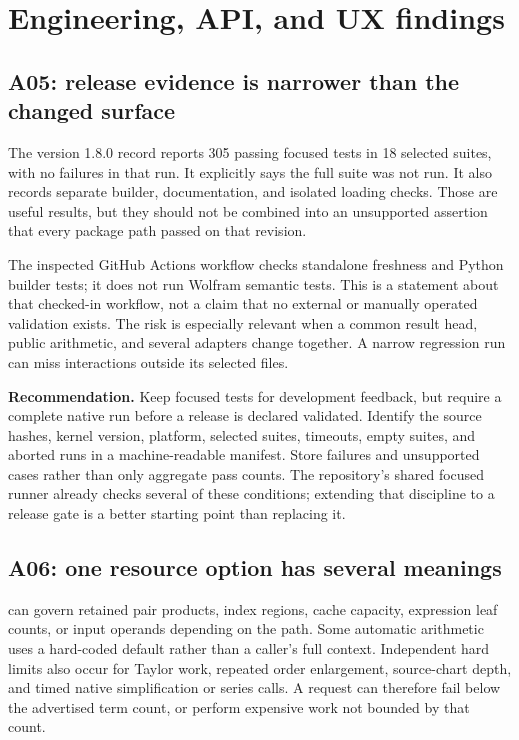 \section{Engineering, API, and UX findings}
\subsection{A05: release evidence is narrower than the changed surface}
The version 1.8.0 record reports 305 passing focused tests in 18 selected suites, with no failures in that run. It explicitly says the full suite was not run. It also records separate builder, documentation, and isolated loading checks. Those are useful results, but they should not be combined into an unsupported assertion that every package path passed on that revision.\cite{validation}

The inspected GitHub Actions workflow checks standalone freshness and Python builder tests; it does not run Wolfram semantic tests. This is a statement about that checked-in workflow, not a claim that no external or manually operated validation exists. The risk is especially relevant when a common result head, public arithmetic, and several adapters change together. A narrow regression run can miss interactions outside its selected files.\cite{workflow}

\textbf{Recommendation.} Keep focused tests for development feedback, but require a complete native run before a release is declared validated. Identify the source hashes, kernel version, platform, selected suites, timeouts, empty suites, and aborted runs in a machine-readable manifest. Store failures and unsupported cases rather than only aggregate pass counts. The repository's shared focused runner already checks several of these conditions; extending that discipline to a release gate is a better starting point than replacing it.\cite{runner}

\subsection{A06: one resource option has several meanings}
 can govern retained pair products, index regions, cache capacity, expression leaf counts, or input operands depending on the path. Some automatic arithmetic uses a hard-coded default rather than a caller's full context. Independent hard limits also occur for Taylor work, repeated order enlargement, source-chart depth, and timed native simplification or series calls. A request can therefore fail below the advertised term count, or perform expensive work not bounded by that count.\cite{core,arithmetic,incremental,sourcecharts,native}

